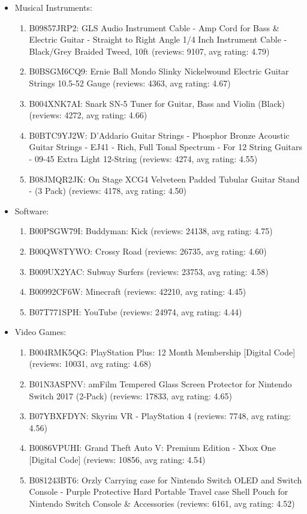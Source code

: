 \documentclass[a4paper, 12pt]{article}
\begin{document}
\begin{itemize}
\begin{enumerate}
        \end{enumerate}
    \item Musical Instruments:
        \begin{enumerate}
            \item B09857JRP2: GLS Audio Instrument Cable - Amp Cord for Bass \& Electric Guitar - Straight to Right Angle 1/4 Inch Instrument Cable - Black/Grey Braided Tweed, 10ft (reviews: 9107, avg rating: 4.79)
            \item B0BSGM6CQ9: Ernie Ball Mondo Slinky Nickelwound Electric Guitar Strings 10.5-52 Gauge (reviews: 4363, avg rating: 4.67)
            \item B004XNK7AI: Snark SN-5 Tuner for Guitar, Bass and Violin (Black) (reviews: 4272, avg rating: 4.66)
            \item B0BTC9YJ2W: D'Addario Guitar Strings - Phosphor Bronze Acoustic Guitar Strings - EJ41 - Rich, Full Tonal Spectrum - For 12 String Guitars - 09-45 Extra Light 12-String (reviews: 4274, avg rating: 4.55)
            \item B08JMQR2JK: On Stage XCG4 Velveteen Padded Tubular Guitar Stand - (3 Pack) (reviews: 4178, avg rating: 4.50)
        \end{enumerate}
    \item Software:
        \begin{enumerate}
            \item B00PSGW79I: Buddyman: Kick (reviews: 24138, avg rating: 4.75)
            \item B00QW8TYWO: Crossy Road (reviews: 26735, avg rating: 4.60)
            \item B009UX2YAC: Subway Surfers (reviews: 23753, avg rating: 4.58)
            \item B00992CF6W: Minecraft (reviews: 42210, avg rating: 4.45)
            \item B07T771SPH: YouTube (reviews: 24974, avg rating: 4.44)
        \end{enumerate}
    \item Video Games:
        \begin{enumerate}
            \item B004RMK5QG: PlayStation Plus: 12 Month Membership [Digital Code] (reviews: 10031, avg rating: 4.68)
            \item B01N3ASPNV: amFilm Tempered Glass Screen Protector for Nintendo Switch 2017 (2-Pack) (reviews: 17833, avg rating: 4.65)
            \item B07YBXFDYN: Skyrim VR - PlayStation 4 (reviews: 7748, avg rating: 4.56)
            \item B0086VPUHI: Grand Theft Auto V: Premium Edition - Xbox One [Digital Code] (reviews: 10856, avg rating: 4.54)
            \item B081243BT6: Orzly Carrying case for Nintendo Switch OLED and Switch Console - Purple Protective Hard Portable Travel case Shell Pouch for Nintendo Switch Console \& Accessories (reviews: 6161, avg rating: 4.52)
        \end{enumerate}
\end{itemize}
\end{document}
